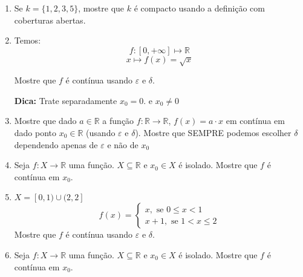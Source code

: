 \documentclass[12pt]{article}
\begin{document}
\begin{enumerate}
    \item Se $k=\{1,2,3,5\}$, mostre que  $k$ é compacto usando a definição com coberturas abertas.
    
    \item Temos: 
    \begin{equation*}
        f:\left[0, +\infty \right] \longmapsto \mathbb{R}
    \end{equation*}
    \begin{equation*}
        x \longmapsto f(x) = \sqrt{x}
    \end{equation*}

    Mostre que $f$ é contínua usando $\varepsilon$ e $\delta$.

    \textbf{Dica:} Trate separadamente $x_0 = 0$. e $x_0 \neq 0$

    \item Mostre que dado $a \in \mathbb{R}$ a função $f: \mathbb{R} \to \mathbb{R}$, $f(x) = a \cdot x$ em contínua em dado ponto $x_0 \in \mathbb{R}$ (usando $\varepsilon \text{ e } \delta$). Mostre que SEMPRE podemos escolher $\delta$ dependendo apenas de $\varepsilon$ e não de $x_0$

    \item Seja $f: X \to \mathbb{R}$ uma função. $X \subseteq \mathbb{R}$ e $x_0 \in X$ é isolado. Mostre que $f$ é contínua em $x_0$.

    \item  $X = [0,1) \cup (2,2]$
    \begin{equation*}
        f(x)=\left\{    
        \begin{array}{l}
            x, \text{ se } 0 \leq x < 1 \\
            x+1, \text{ se } 1 <x \leq 2
        \end{array}
        \right.
    \end{equation*}
    Mostre que $f$ é contínua usando $\varepsilon$ e $\delta$.

    \item Seja $f: X \to \mathbb{R}$ uma função. $X \subseteq \mathbb{R}$ e $x_0 \in X$ é isolado. Mostre que $f$ é contínua em $x_0$.
\end{enumerate}
\end{document}
